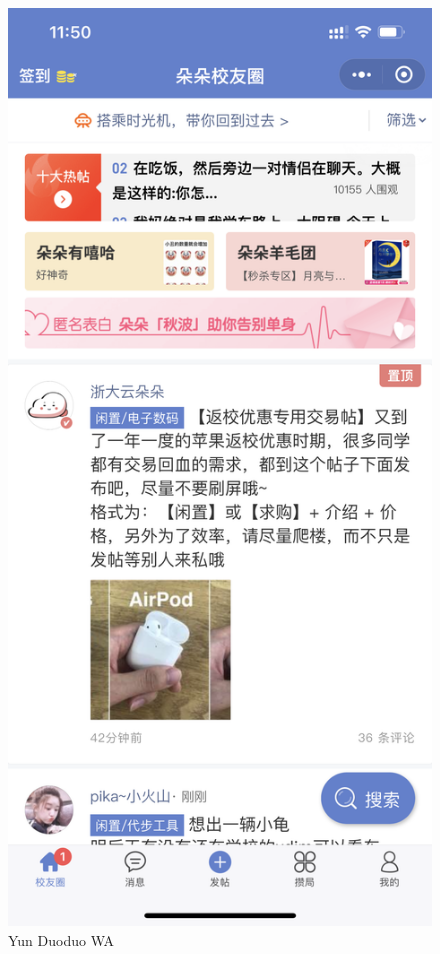 \documentclass[a4paper,12pt]{texMemo}
\begin{document}
\begin{enumerate}
\begin{figure}[H]
  \begin{minipage}[t]{0.5\linewidth}
    \centering
    \includegraphics[scale=0.07]{IMG_2920.PNG}
    \caption{Yun Duoduo WA}

\end{minipage}
\end{figure}
\end{enumerate}
\end{document}
